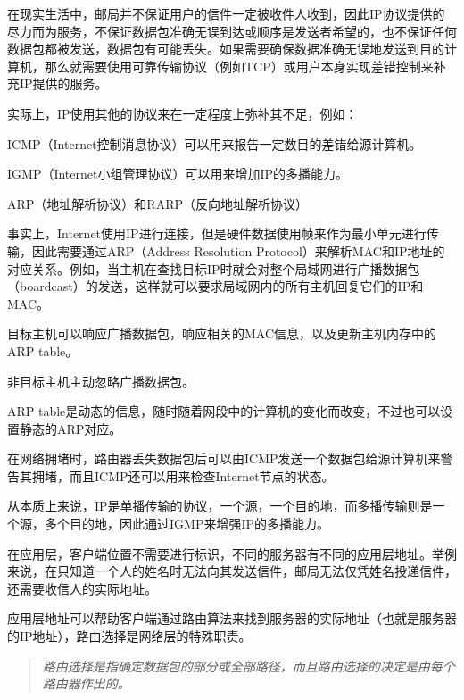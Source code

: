 在现实生活中，邮局并不保证用户的信件一定被收件人收到，因此IP协议提供的尽力而为服务，不保证数据包准确无误到达或顺序是发送者希望的，也不保证任何数据包都被发送，数据包有可能丢失。如果需要确保数据准确无误地发送到目的计算机，那么就需要使用可靠传输协议（例如TCP）或用户本身实现差错控制来补充IP提供的服务。

实际上，IP使用其他的协议来在一定程度上弥补其不足，例如：

\begin{compactitem}
\item ICMP（Internet控制消息协议）可以用来报告一定数目的差错给源计算机。
\item IGMP（Internet小组管理协议）可以用来增加IP的多播能力。
\item ARP（地址解析协议）和RARP（反向地址解析协议）
\end{compactitem}

事实上，Internet使用IP进行连接，但是硬件数据使用帧来作为最小单元进行传输，因此需要通过ARP（Address Resolution Protocol）来解析MAC和IP地址的对应关系。例如，当主机在查找目标IP时就会对整个局域网进行广播数据包（boardcast）的发送，这样就可以要求局域网内的所有主机回复它们的IP和MAC。

\begin{compactitem}
\item 目标主机可以响应广播数据包，响应相关的MAC信息，以及更新主机内存中的ARP table。
\item 非目标主机主动忽略广播数据包。
\end{compactitem}

ARP table是动态的信息，随时随着网段中的计算机的变化而改变，不过也可以设置静态的ARP对应。


在网络拥堵时，路由器丢失数据包后可以由ICMP发送一个数据包给源计算机来警告其拥堵，而且ICMP还可以用来检查Internet节点的状态。

从本质上来说，IP是单播传输的协议，一个源，一个目的地，而多播传输则是一个源，多个目的地，因此通过IGMP来增强IP的多播能力。

在应用层，客户端位置不需要进行标识，不同的服务器有不同的应用层地址。举例来说，在只知道一个人的姓名时无法向其发送信件，邮局无法仅凭姓名投递信件，还需要收信人的实际地址。

应用层地址可以帮助客户端通过路由算法来找到服务器的实际地址（也就是服务器的IP地址），路由选择是网络层的特殊职责。

\begin{quote}
\textsl{路由选择是指确定数据包的部分或全部路径，而且路由选择的决定是由每个路由器作出的。}
\end{quote}

